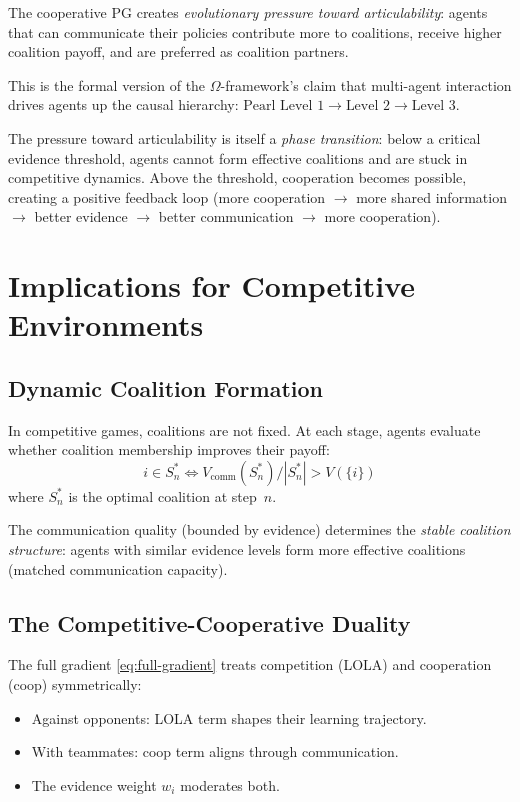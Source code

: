 \documentclass[11pt]{article}
\begin{document}
The cooperative PG creates \emph{evolutionary pressure toward articulability}:
agents that can communicate their policies contribute more to coalitions,
receive higher coalition payoff, and are preferred as coalition partners.

This is the formal version of the $\Omega$-framework's claim that
multi-agent interaction drives agents up the causal hierarchy:
$\text{Pearl Level 1} \to \text{Level 2} \to \text{Level 3}$.

The pressure toward articulability is itself a \emph{phase transition}:
below a critical evidence threshold, agents cannot form effective
coalitions and are stuck in competitive dynamics. Above the threshold,
cooperation becomes possible, creating a positive feedback loop
(more cooperation $\to$ more shared information $\to$ better evidence
$\to$ better communication $\to$ more cooperation).


\section{Implications for Competitive Environments}

\subsection{Dynamic Coalition Formation}

In competitive games, coalitions are not fixed. At each stage, agents
evaluate whether coalition membership improves their payoff:
\begin{equation}
  i \in S^*_n \iff V_{\text{comm}}(S^*_n) / |S^*_n| > V(\{i\})
\end{equation}
where $S^*_n$ is the optimal coalition at step~$n$.

The communication quality (bounded by evidence) determines the
\emph{stable coalition structure}: agents with similar evidence
levels form more effective coalitions (matched communication capacity).

\subsection{The Competitive-Cooperative Duality}

The full gradient \eqref{eq:full-gradient} treats competition (LOLA)
and cooperation (coop) symmetrically:
\begin{itemize}
  \item Against opponents: LOLA term shapes their learning trajectory.
  \item With teammates: coop term aligns through communication.
  \item The evidence weight $w_i$ moderates both.
\end{itemize}
\end{document}
